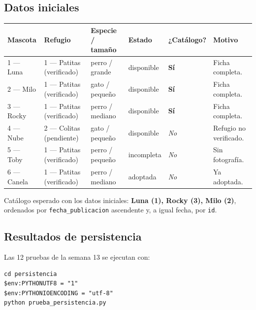 \documentclass[11pt,a4paper]{article}
\newcommand{\code}[1]{\texttt{#1}}
\newcommand{\thead}[1]{\textbf{#1}}
\begin{document}
\subsection{Datos iniciales}

{\footnotesize
\begin{tabularx}{\linewidth}{@{}V{0.8}V{1.2}V{0.9}V{0.75}Z{0.8}V{1.55}@{}}
\toprule
\thead{Mascota} & \thead{Refugio} & \thead{Especie / tamaño} &
\thead{Estado} & \thead{¿Catálogo?} & \thead{Motivo} \\  --- Luna & 1 --- Patitas (verificado) & perro / grande & disponible &
\textbf{Sí} & Ficha completa. \\
2 --- Milo & 1 --- Patitas (verificado) & gato / pequeño & disponible &
\textbf{Sí} & Ficha completa. \\
3 --- Rocky & 1 --- Patitas (verificado) & perro / mediano & disponible &
\textbf{Sí} & Ficha completa. \\
4 --- Nube & 2 --- Colitas (pendiente) & gato / pequeño & disponible &
\textit{No} & Refugio no verificado. \\
5 --- Toby & 1 --- Patitas (verificado) & perro / pequeño & incompleta &
\textit{No} & Sin fotografía. \\
6 --- Canela & 1 --- Patitas (verificado) & perro / mediano & adoptada &
\textit{No} & Ya adoptada. \\
\bottomrule
\end{tabularx}
}

Catálogo esperado con los datos iniciales: \textbf{Luna (1), Rocky (3), Milo
(2)}, ordenados por \code{fecha\_publicacion} ascendente y, a igual fecha, por
\code{id}.

\subsection{Resultados de persistencia}

Las 12 pruebas de la semana 13 se ejecutan con:

\begin{lstlisting}
cd persistencia
$env:PYTHONUTF8 = "1"
$env:PYTHONIOENCODING = "utf-8"
python prueba_persistencia.py
\end{lstlisting}
\end{document}
